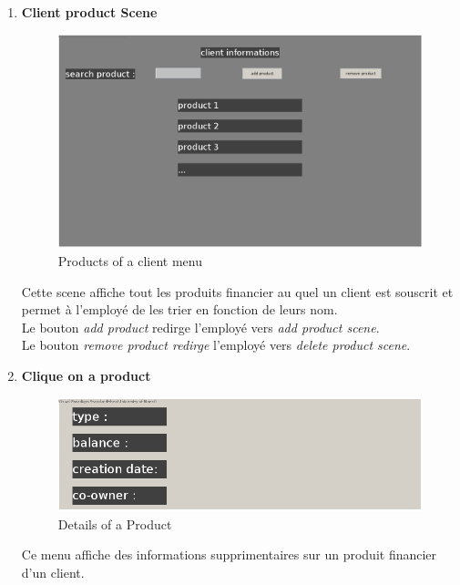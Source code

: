 \documentclass[../rapport.tex]{subfiles}
\begin{document}
\begin{enumerate}
\item \textbf{Client product Scene} \\
		\begin{figure}[h!]
				\centering \includegraphics[scale=0.2]{ressources/photos_diagrammes/app2/gui/clientProductMenu.jpg}
				\caption{ Products of a client menu}
		\end{figure}
Cette scene affiche tout les produits financier au quel un client est souscrit et permet à l'employé de les trier en fonction de leurs nom.\\
Le bouton \textit{add product} redirge l'employé vers \textit{add product scene}.\\
Le bouton \textit{remove product redirge} l'employé vers \textit{delete product scene}.\\


\newpage
\item \textbf{Clique on a product} \\
		\begin{figure}[h!]
				\centering \includegraphics[scale=0.2]{ressources/photos_diagrammes/app2/gui/clickOnAProductInProductMenu.jpg}
				\caption{ Details of a Product }
		\end{figure}
Ce menu affiche des informations supprimentaires sur un produit financier d'un client.\\

\end{enumerate}
\end{document}

